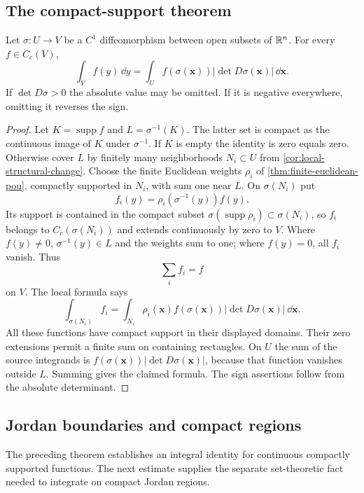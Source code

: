 \subsection{The compact-support theorem}
\begin{theorem}
\label{cor:compact-support-change-variables}
Let $\sigma:U\to V$ be a $C^1$ diffeomorphism between open subsets of
$\mathbb{R}^n$. For every $f\in C_c(V)$,
\[
\boxed{\int_V f(y)\,\dd y
=\int_U f(\sigma(\mathbf{x}))|\det D\sigma(\mathbf{x})|\,\dd\mathbf{x}.}
\]
If $\det D\sigma>0$ the absolute value may be omitted. If it is negative
everywhere, omitting it reverses the sign.
\end{theorem}
\begin{proof}
Let $K=\operatorname{supp}f$ and $L=\sigma^{-1}(K)$. The latter set is
compact as the continuous image of $K$ under $\sigma^{-1}$.
If $K$ is empty the identity is zero equals zero. Otherwise cover $L$
by finitely many neighborhoods $N_i\subset U$ from
\cref{cor:local-structural-change}. Choose the finite Euclidean weights
$\rho_i$ of \cref{thm:finite-euclidean-pou}, compactly supported in
$N_i$, with sum one near $L$. On $\sigma(N_i)$ put
\[
f_i(y)=\rho_i(\sigma^{-1}(y))f(y).
\]
Its support is contained in the compact subset
$\sigma(\operatorname{supp}\rho_i)\subset\sigma(N_i)$, so $f_i$ belongs
to $C_c(\sigma(N_i))$ and extends continuously by zero to $V$.
Where $f(y)\ne0$, $\sigma^{-1}(y)\in L$ and the weights sum to one;
where $f(y)=0$, all $f_i$ vanish. Thus
\[
\sum_i f_i=f
\]
 on $V$.
The local formula says
\[
\int_{\sigma(N_i)}f_i
=\int_{N_i}\rho_i(\mathbf{x})f(\sigma(\mathbf{x}))|\det D\sigma(\mathbf{x})|\,\dd\mathbf{x}.
\]
All these functions have compact support in their displayed domains.
Their zero extensions permit a finite sum on containing rectangles.
On $U$ the sum of the source integrands is
$f(\sigma(\mathbf{x}))|\det D\sigma(\mathbf{x})|$, because that function vanishes outside
$L$. Summing gives the claimed formula. The sign assertions follow
from the absolute determinant.
\end{proof}

\subsection{Jordan boundaries and compact regions}
The preceding theorem establishes an integral identity for continuous
compactly supported functions. The next estimate supplies the separate
set-theoretic fact needed to integrate on compact Jordan regions.

